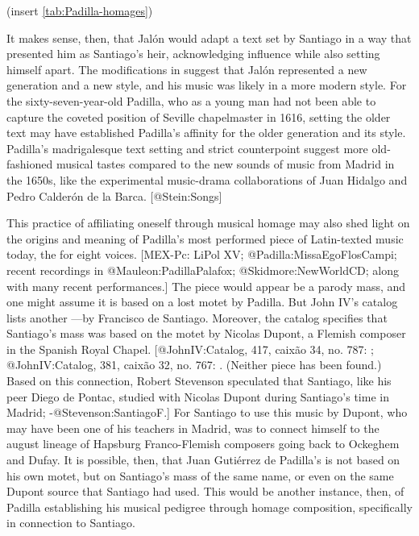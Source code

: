 (insert \cref{tab:Padilla-homages})
\label{tab:Padilla-homages}

It makes sense, then, that Jalón would adapt a text set by Santiago in a way
that presented him as Santiago's heir, acknowledging influence while also
setting himself apart.
The modifications in  suggest that Jalón represented a
new generation and a new style, and his music was likely in a more modern style.
For the sixty-seven-year-old Padilla, who as a young man had not been able to
capture the coveted position of Seville chapelmaster in 1616, setting the older
text may have established Padilla's affinity for the older generation and its
style.
Padilla's madrigalesque text setting and strict counterpoint suggest more
old-fashioned musical tastes compared to the new sounds of music from Madrid in
the 1650s, like the experimental music-drama collaborations of Juan Hidalgo
and Pedro Calderón de la Barca.
[@Stein:Songs]

This practice of affiliating oneself through musical homage may also shed light
on the origins and meaning of Padilla's most performed piece of Latin-texted
music today, the  for eight voices.
[MEX-Pc: LiPol XV; @Padilla:MissaEgoFlosCampi; recent recordings in
@Mauleon:PadillaPalafox; @Skidmore:NewWorldCD; along with many recent
performances.]
The piece would appear be a parody mass, and one might assume it is based on a
lost motet  by Padilla.
But John IV's catalog lists another ---by Francisco de
Santiago.
Moreover, the catalog specifies that Santiago's mass was based on the motet
 by Nicolas Dupont, a Flemish composer in the Spanish Royal
Chapel.
[@JohnIV:Catalog, 417, caixão 34, no. 787: 
; @JohnIV:Catalog, 381, caixão 32, no. 767: .
(Neither piece has been found.)
Based on this connection, Robert Stevenson speculated that Santiago, like his
peer Diego de Pontac, studied with Nicolas Dupont during Santiago's time in
Madrid; -@Stevenson:SantiagoF.]
For Santiago to use this music by Dupont, who may have been one of his teachers
in Madrid, was to connect himself to the august lineage of Hapsburg
Franco-Flemish composers going back to Ockeghem and Dufay.
It is possible, then, that Juan Gutiérrez de Padilla's 
is not based on his own motet, but on Santiago's mass of the same name, or even
on the same Dupont source that Santiago had used.
This would be another instance, then, of Padilla establishing his musical
pedigree through homage composition, specifically in connection to Santiago.


